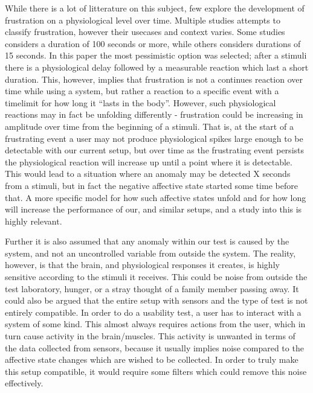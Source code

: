 While there is a lot of litterature on this subject, few explore the development of frustration on a physiological level over time. 
Multiple studies attempts to classify frustration, however their usecases and context varies. 
Some studies considers a duration of 100 seconds or more\cite{machine_learning_100s_gsr}, while others considers durations of 15 seconds\cite{brainwave_signals_frustration}.
In this paper the most pessimistic option was selected; after a stimuli there is a physiological delay followed by a measurable reaction which last a short duration.
This, however, implies that frustration is not a continues reaction over time while using a system, but rather a reaction to a specific event with a timelimit for how long it ``lasts in the body''.
However, such physiological reactions may in fact be unfolding differently - frustration could be increasing in amplitude over time from the beginning of a stimuli. 
That is, at the start of a frustrating event a user may not produce physiological spikes large enough to be detectable with our current setup, but over time as the frustrating event persists the physiological reaction will increase up until a point where it is detectable. 
This would lead to a situation where an anomaly may be detected X seconds from a stimuli, but in fact the negative affective state started some time before that.
A more specific model for how such affective states unfold and for how long will increase the performance of our, and similar setups, and
a study into this is highly relevant.

Further it is also assumed that any anomaly within our test is caused by the system, and not an uncontrolled variable from outside the system. 
The reality, however, is that the brain, and physiological responses it creates, is highly sensitive according to the stimuli it receives.
This could be noise from outside the test laboratory, hunger, or a stray thought of a family member passing away. 
It could also be argued that the entire setup with sensors and the type of test is not entirely compatible. 
In order to do a usability test, a user has to interact with a system of some kind. 
This almost always requires actions from the user, which in turn cause activity in the brain/muscles. 
This activity is unwanted in terms of the data collected from sensors, because it usually implies noise compared to the affective state changes which are wished to be collected. In order to truly make this setup compatible, it would require some filters which could remove this noise effectively.

